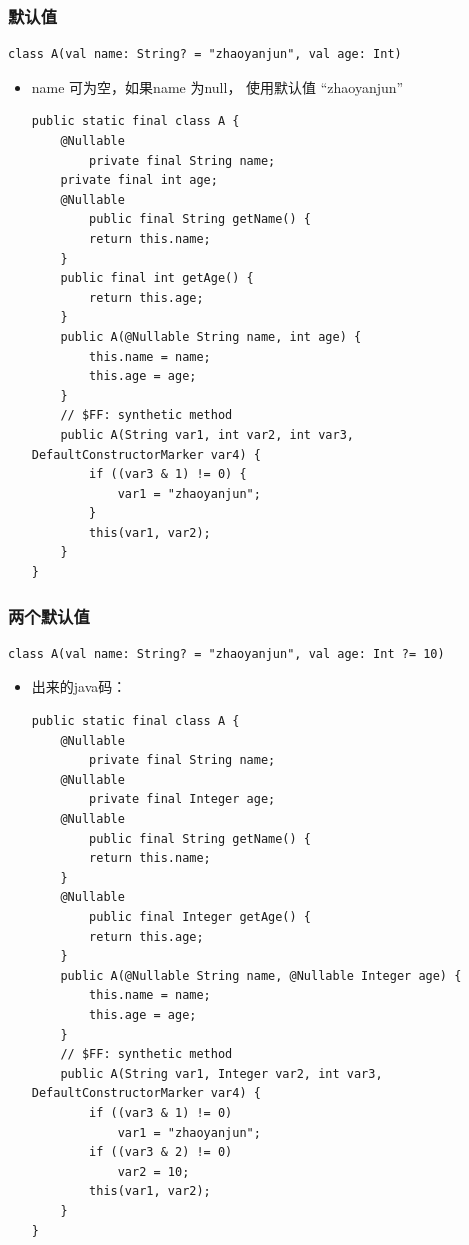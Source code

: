 \documentclass[9pt, b5paper]{article}
\begin{document}
\subsubsection{默认值}
\label{sec-6-4-3}
\begin{verbatim}
class A(val name: String? = "zhaoyanjun", val age: Int)
\end{verbatim}
\begin{itemize}
\item name 可为空，如果name 为null， 使用默认值 “zhaoyanjun”
\begin{verbatim}
public static final class A {
    @Nullable
        private final String name;
    private final int age;
    @Nullable
        public final String getName() {
        return this.name;
    }
    public final int getAge() {
        return this.age;
    }
    public A(@Nullable String name, int age) {
        this.name = name;
        this.age = age;
    }
    // $FF: synthetic method
    public A(String var1, int var2, int var3, DefaultConstructorMarker var4) {
        if ((var3 & 1) != 0) {
            var1 = "zhaoyanjun";
        }
        this(var1, var2);
    }
}
\end{verbatim}
\end{itemize}

\subsubsection{两个默认值}
\label{sec-6-4-4}
\begin{verbatim}
class A(val name: String? = "zhaoyanjun", val age: Int ?= 10)
\end{verbatim}
\begin{itemize}
\item 出来的java码：
\begin{verbatim}
public static final class A {
    @Nullable
        private final String name;
    @Nullable
        private final Integer age;
    @Nullable
        public final String getName() {
        return this.name;
    }
    @Nullable
        public final Integer getAge() {
        return this.age;
    }
    public A(@Nullable String name, @Nullable Integer age) {
        this.name = name;
        this.age = age;
    }
    // $FF: synthetic method
    public A(String var1, Integer var2, int var3, DefaultConstructorMarker var4) {
        if ((var3 & 1) != 0) 
            var1 = "zhaoyanjun";
        if ((var3 & 2) != 0) 
            var2 = 10;
        this(var1, var2);
    }
}
\end{verbatim}
\end{itemize}
\end{document}
